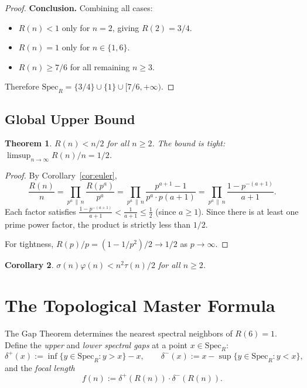 \documentclass[12pt]{article}
\newtheorem{theorem}{Theorem}[section]
\newtheorem{corollary}[theorem]{Corollary}
\newcommand{\SpecR}{\mathrm{Spec}_R}
\begin{document}
\begin{proof}
\medskip\noindent\textbf{Conclusion.}
Combining all cases:
\begin{itemize}
  \item $R(n)<1$ only for $n=2$, giving $R(2)=3/4$.
  \item $R(n)=1$ only for $n\in\{1,6\}$.
  \item $R(n)\ge7/6$ for all remaining $n\ge3$.
\end{itemize}
Therefore $\SpecR=\{3/4\}\cup\{1\}\cup[7/6,+\infty)$.
\end{proof}

\subsection{Global Upper Bound}

\begin{theorem}\label{thm:bound}
$R(n) < n/2$ for all $n\ge2$.  The bound is tight: $\limsup_{n\to\infty}R(n)/n=1/2$.
\end{theorem}

\begin{proof}
By Corollary~\ref{cor:euler},
\[
  \frac{R(n)}{n} = \prod_{p^a\,\|\,n}\frac{R(p^a)}{p^a}
  = \prod_{p^a\,\|\,n}\frac{p^{a+1}-1}{p^a\cdot p(a+1)}
  = \prod_{p^a\,\|\,n}\frac{1-p^{-(a+1)}}{a+1}.
\]
Each factor satisfies $\frac{1-p^{-(a+1)}}{a+1}<\frac{1}{a+1}\le\frac12$
(since $a\ge1$).  Since there is at least one prime power factor, the product
is strictly less than $1/2$.

For tightness, $R(p)/p=(1-1/p^2)/2\to1/2$ as $p\to\infty$.
\end{proof}

\begin{corollary}
$\sigma(n)\varphi(n) < n^2\tau(n)/2$ for all $n\ge2$.
\end{corollary}

\section{The Topological Master Formula}
\label{sec:master}

The Gap Theorem determines the nearest spectral neighbors of $R(6)=1$.
Define the \emph{upper} and \emph{lower spectral gaps} at a point $x\in\SpecR$:
\[
  \delta^+(x) := \inf\{y\in\SpecR : y>x\} - x,
  \qquad
  \delta^-(x) := x - \sup\{y\in\SpecR : y<x\},
\]
and the \emph{focal length}
\[
  f(n) := \delta^+(R(n))\cdot\delta^-(R(n)).
\]
\end{document}
